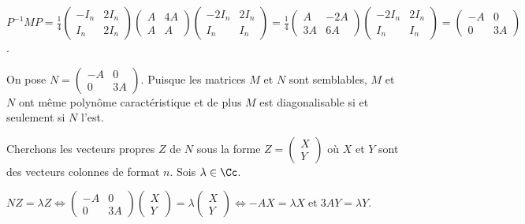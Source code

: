 {{\begin{center} 
$P^{-1}MP=\frac{1}{4}\left(
\begin{array}{cc}
-I_n&2I_{n}\\
I_n&2I_n
\end{array}
\right)\left(
\begin{array}{cc}
A&4A\\
A&A
\end{array}
\right)\left(
\begin{array}{cc}
-2I_n&2I_{n}\\
I_n&I_n
\end{array}
\right)=\frac{1}{4}\left(
\begin{array}{cc}
A&-2A\\
3A&6A
\end{array}
\right)\left(
\begin{array}{cc}
-2I_n&2I_{n}\\
I_n&I_n
\end{array}
\right)
=\left(
\begin{array}{cc}
-A&0\\
0&3A
\end{array}
\right)$.
\end{center}

On pose $N=\left(
\begin{array}{cc}
-A&0\\
0&3A
\end{array}
\right)$. Puisque les matrices $M$ et $N$ sont semblables, $M$ et $N$ ont même polynôme caractéristique et de plus $M$ est diagonalisable si et seulement si $N$ l'est.

Cherchons les vecteurs propres $Z$ de $N$ sous la forme $Z=\left(
\begin{array}{c}
X\\
Y
\end{array}
\right)$ où $X$ et $Y$ sont des vecteurs colonnes de format $n$. Sois $\lambda\in\Cc$.

\begin{center}
$NZ=\lambda Z\Leftrightarrow\left(
\begin{array}{cc}
-A&0\\
0&3A
\end{array}
\right)\left(
\begin{array}{c}
X\\
Y
\end{array}
\right)=\lambda\left(
\begin{array}{c}
X\\
Y
\end{array}
\right)\Leftrightarrow -AX =\lambda X\;\text{et}\;3AY =\lambda Y$.
\end{center}

}}
